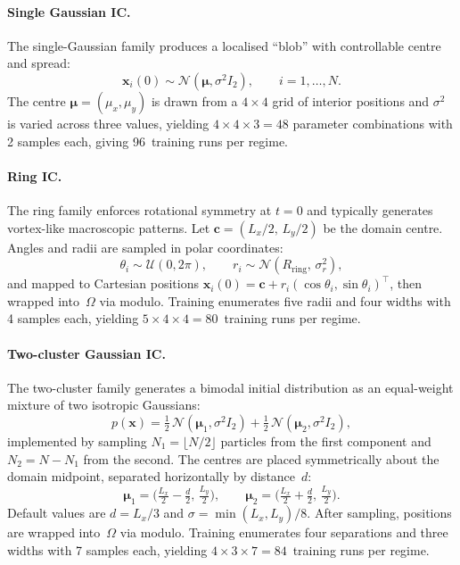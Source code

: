 \paragraph{Single Gaussian IC.}
\label{subsec:ic_gaussian}

The single-Gaussian family produces a localised
``blob'' with controllable centre and spread:
\begin{equation}
  \mathbf{x}_i(0)\sim \mathcal{N}(\boldsymbol{\mu},\sigma^2 I_2),
  \qquad i=1,\dots,N.
  \label{eq:ic_gaussian_def}
\end{equation}
The centre $\boldsymbol{\mu}=(\mu_x,\mu_y)$ is drawn from a $4\times 4$ grid
of interior positions and
$\sigma^2$ is varied across three values, yielding
$4\times 4\times 3=48$ parameter combinations with 2 samples each,
giving 96~training runs per regime.

\paragraph{Ring IC.}
\label{subsec:ic_ring}

The ring family enforces rotational symmetry at
$t{=}0$ and typically generates vortex-like macroscopic patterns.  Let
$\mathbf{c}=(L_x/2,\,L_y/2)$ be the domain centre.  Angles and radii are
sampled in polar coordinates:
\begin{equation}
  \theta_i \sim \mathcal{U}(0,2\pi),\qquad
  r_i \sim \mathcal{N}(R_{\mathrm{ring}},\,\sigma_r^2),
  \label{eq:ic_ring_polar}
\end{equation}
and mapped to Cartesian positions
$\mathbf{x}_i(0)=\mathbf{c}+r_i(\cos\theta_i,\sin\theta_i)^\top$, then
wrapped into~$\Omega$ via modulo.  Training enumerates five radii and
four widths with 4 samples each, yielding $5\times 4\times 4=80$~training
runs per regime.

\paragraph{Two-cluster Gaussian IC.}
\label{subsec:ic_two_clusters}

The two-cluster family generates a bimodal initial
distribution as an equal-weight mixture of two isotropic Gaussians:
\begin{equation}
  p(\mathbf{x})
  =\tfrac12\,\mathcal{N}(\boldsymbol{\mu}_1,\sigma^2 I_2)
  +\tfrac12\,\mathcal{N}(\boldsymbol{\mu}_2,\sigma^2 I_2),
  \label{eq:ic_two_clusters_mix}
\end{equation}
implemented by sampling $N_1=\lfloor N/2\rfloor$ particles from the first
component and $N_2=N-N_1$ from the second.  The centres are placed
symmetrically about the domain midpoint, separated horizontally by distance~$d$:
\begin{equation}
  \boldsymbol{\mu}_1=\Big(\tfrac{L_x}{2}-\tfrac{d}{2},\,\tfrac{L_y}{2}\Big),
  \qquad
  \boldsymbol{\mu}_2=\Big(\tfrac{L_x}{2}+\tfrac{d}{2},\,\tfrac{L_y}{2}\Big).
  \label{eq:ic_two_clusters_centers}
\end{equation}
Default values are $d=L_x/3$ and $\sigma=\min(L_x,L_y)/8$.  After sampling,
positions are wrapped into~$\Omega$ via modulo.  Training enumerates
four separations and three widths with 7 samples each, yielding
$4\times 3\times 7=84$~training runs per regime.

